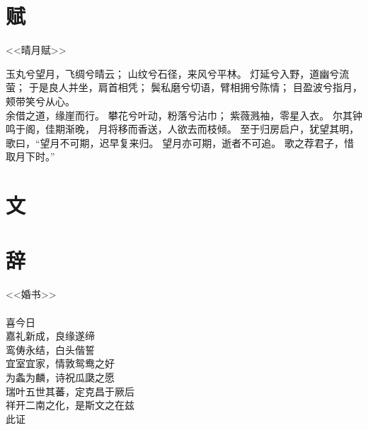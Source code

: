 \documentclass[12pt,a4paper]{article}
\begin{document}
\newpage
\section*{赋}

\begin{center}
<<晴月赋>>\\
\end{center}

玉丸兮望月，飞绸兮晴云；
山纹兮石径，来风兮平林。
灯延兮入野，道幽兮流萤；
于是良人并坐，肩首相凭；
鬓私磨兮切语，臂相拥兮陈情；
目盈波兮指月，颊带笑兮从心。\\

余借之道，缘崖而行。
攀花兮叶动，粉落兮沾巾；
紫薇溅袖，零星入衣。
尔其钟鸣于阁，佳期渐晚，
月将移而香送，人欲去而枝倾。
至于归房启户，犹望其明，
歌曰，“望月不可期，迟早复来归。
望月亦可期，逝者不可追。
歌之荐君子，惜取月下时。”

\newpage
\section*{文}

\newpage
\section*{辞}

\begin{center}
<<婚书>>\\
\qquad\\
喜今日\\
嘉礼新成，良缘遂缔\\
鸾俦永结，白头偕誓\\
宜室宜家，情敦鸳鸯之好\\
为螽为麟，诗祝瓜瓞之愿\\
瑞叶五世其蕃，定克昌于厥后\\
祥开二南之化，是斯文之在兹\\
此证\\
\end{center}

\newpage
\end{document}
